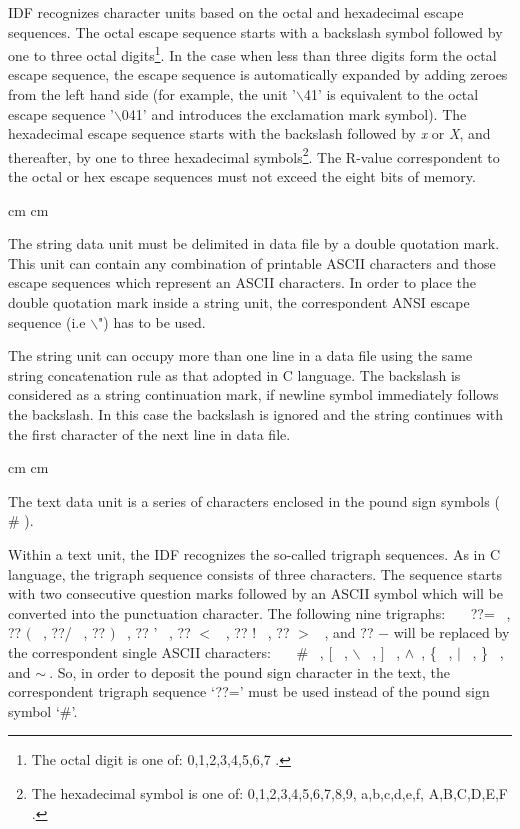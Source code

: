 \newpage

IDF recognizes character units based on the octal and hexadecimal escape
sequences. The octal escape sequence starts with a backslash symbol followed by
one to three octal digits\footnote{
The octal digit is one of: 0,1,2,3,4,5,6,7 .
}.
In the case when less than three digits form the octal escape sequence,
the escape sequence is automatically expanded by adding zeroes 
from the left hand side (for example, the unit '$\backslash$41' is equivalent 
to the octal escape sequence '$\backslash$041'
and introduces the exclamation mark symbol).
The hexadecimal escape sequence starts with the backslash followed by
{\it x} or {\it X}, and thereafter, 
by one to three hexadecimal symbols\footnote{
The hexadecimal symbol is one of: 
0,1,2,3,4,5,6,7,8,9, a,b,c,d,e,f, A,B,C,D,E,F .
}.
The R-value correspondent to the octal or hex escape sequences
must not exceed the eight bits of memory.

 cm
 cm

The string data unit must be delimited in data file by a double quotation mark.
This unit can contain any combination of printable ASCII characters
and those escape sequences which represent an ASCII characters.
In order to place the double quotation mark
inside a string unit, the correspondent ANSI escape sequence 
(i.e $\backslash$") has to be used.

The string unit can occupy more than one line in a data file
using the same string concatenation rule as that adopted in C language.
The backslash is considered as a string continuation mark,
if newline symbol immediately follows the backslash.
In this case the backslash is ignored and the string continues
with the first character of the next line in data file.

 cm
 cm

The text data unit is a series of characters enclosed in
the pound sign symbols ( \# ).

Within a text unit, the IDF recognizes the so-called trigraph sequences.
As in C language, the trigraph sequence consists of three characters.
The sequence starts with two consecutive question marks followed
by an ASCII symbol which will be converted into the punctuation
character. The following nine trigraphs:\hfil\break
{ 
\ \ \ ??= ~, ?? $($ ~, ??/ ~, ?? $)$ ~, ?? ' ~, ?? $<$ ~, ?? ! ~, ?? $>$ ~,
and ?? $-$
}\hfil\break
will be replaced by the correspondent single ASCII characters:\hfil\break
{
\ \ \ \# ~, $[$ ~, $\backslash$ ~, $]$ ~, $\wedge$\ , \{ ~, $|$ \ , \} ~, and
$\sim\ $.
}\hfil\break
So, in order to deposit the pound sign character in the text,
the correspondent trigraph sequence `??=' must be used instead of 
the pound sign symbol `\#'.


